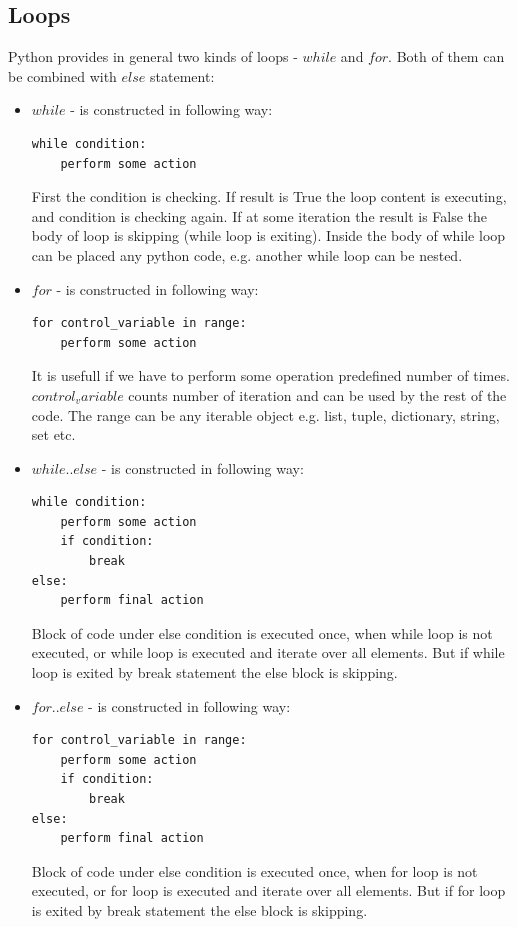 \documentclass{article}
\begin{document}
	\subsection{Loops}
	Python provides in general two kinds of loops - $while$ and $for$. Both of them can be combined with $else$ statement:
	\begin{itemize}
	\item $while$ - is constructed in following way:
	\begin{lstlisting}[style=pystyle]
while condition:
	perform some action
	\end{lstlisting}
	First the condition is checking. If result is True the loop content is executing, and condition is checking again. If at some iteration the result is False the body of loop is skipping (while loop is exiting).
	Inside the body of while loop can be placed any python code, e.g. another while loop can be nested.
	\item $for$ - is constructed in following way:
	\begin{lstlisting}[style=pystyle]
for control_variable in range:
	perform some action
	\end{lstlisting}
	It is usefull if we have to perform some operation predefined number of times.$control_variable$ counts number of iteration and can be used by the rest of the code. The range can be any iterable object e.g. list, tuple, dictionary, string, set etc.
	\item $while..else$ - is constructed in following way:
	\begin{lstlisting}[style=pystyle]
while condition:
	perform some action
	if condition:
		break
else:
	perform final action
	\end{lstlisting}
	Block of code under else condition is executed once, when while loop is not executed, or while loop is executed and iterate over all elements. But if while loop is exited by break statement the else block is skipping.
	\item $for..else$ - is constructed in following way:
	\begin{lstlisting}[style=pystyle]
for control_variable in range:
	perform some action
	if condition:
		break
else:
	perform final action
	\end{lstlisting}
	Block of code under else condition is executed once, when for loop is not executed, or for loop is executed and iterate over all elements. But if for loop is exited by break statement the else block is skipping.
	\end{itemize}
	
\end{document}
